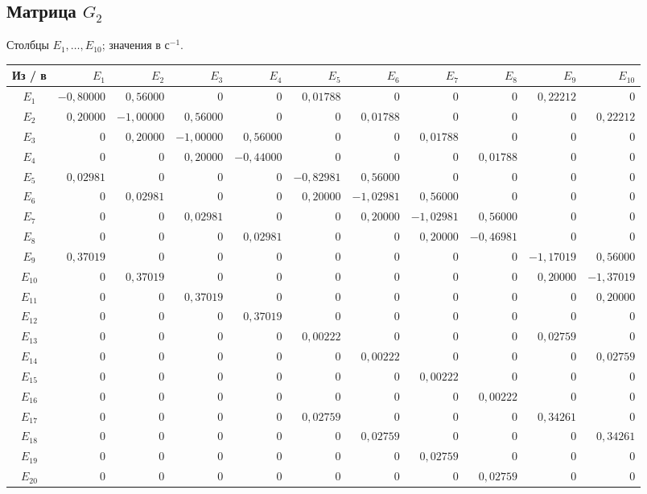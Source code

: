 \documentclass[12pt,a4paper]{article}
\begin{document}
\subsection{Матрица $G_2$}
\noindent Столбцы $E_{1},\ldots,E_{10}$; значения в $\text{с}^{-1}$.
\begin{center}\scriptsize\setlength{\tabcolsep}{2.6pt}\renewcommand{\arraystretch}{1.18}
\begin{tabular}{|c|r|r|r|r|r|r|r|r|r|r|}\hline
Из / в&$E_{1}$&$E_{2}$&$E_{3}$&$E_{4}$&$E_{5}$&$E_{6}$&$E_{7}$&$E_{8}$&$E_{9}$&$E_{10}$\\\hline
$E_{1}$&$-0{,}80000$&$0{,}56000$&$0$&$0$&$0{,}01788$&$0$&$0$&$0$&$0{,}22212$&$0$\\\hline
$E_{2}$&$0{,}20000$&$-1{,}00000$&$0{,}56000$&$0$&$0$&$0{,}01788$&$0$&$0$&$0$&$0{,}22212$\\\hline
$E_{3}$&$0$&$0{,}20000$&$-1{,}00000$&$0{,}56000$&$0$&$0$&$0{,}01788$&$0$&$0$&$0$\\\hline
$E_{4}$&$0$&$0$&$0{,}20000$&$-0{,}44000$&$0$&$0$&$0$&$0{,}01788$&$0$&$0$\\\hline
$E_{5}$&$0{,}02981$&$0$&$0$&$0$&$-0{,}82981$&$0{,}56000$&$0$&$0$&$0$&$0$\\\hline
$E_{6}$&$0$&$0{,}02981$&$0$&$0$&$0{,}20000$&$-1{,}02981$&$0{,}56000$&$0$&$0$&$0$\\\hline
$E_{7}$&$0$&$0$&$0{,}02981$&$0$&$0$&$0{,}20000$&$-1{,}02981$&$0{,}56000$&$0$&$0$\\\hline
$E_{8}$&$0$&$0$&$0$&$0{,}02981$&$0$&$0$&$0{,}20000$&$-0{,}46981$&$0$&$0$\\\hline
$E_{9}$&$0{,}37019$&$0$&$0$&$0$&$0$&$0$&$0$&$0$&$-1{,}17019$&$0{,}56000$\\\hline
$E_{10}$&$0$&$0{,}37019$&$0$&$0$&$0$&$0$&$0$&$0$&$0{,}20000$&$-1{,}37019$\\\hline
$E_{11}$&$0$&$0$&$0{,}37019$&$0$&$0$&$0$&$0$&$0$&$0$&$0{,}20000$\\\hline
$E_{12}$&$0$&$0$&$0$&$0{,}37019$&$0$&$0$&$0$&$0$&$0$&$0$\\\hline
$E_{13}$&$0$&$0$&$0$&$0$&$0{,}00222$&$0$&$0$&$0$&$0{,}02759$&$0$\\\hline
$E_{14}$&$0$&$0$&$0$&$0$&$0$&$0{,}00222$&$0$&$0$&$0$&$0{,}02759$\\\hline
$E_{15}$&$0$&$0$&$0$&$0$&$0$&$0$&$0{,}00222$&$0$&$0$&$0$\\\hline
$E_{16}$&$0$&$0$&$0$&$0$&$0$&$0$&$0$&$0{,}00222$&$0$&$0$\\\hline
$E_{17}$&$0$&$0$&$0$&$0$&$0{,}02759$&$0$&$0$&$0$&$0{,}34261$&$0$\\\hline
$E_{18}$&$0$&$0$&$0$&$0$&$0$&$0{,}02759$&$0$&$0$&$0$&$0{,}34261$\\\hline
$E_{19}$&$0$&$0$&$0$&$0$&$0$&$0$&$0{,}02759$&$0$&$0$&$0$\\\hline
$E_{20}$&$0$&$0$&$0$&$0$&$0$&$0$&$0$&$0{,}02759$&$0$&$0$\\\hline
\end{tabular}\end{center}
\end{document}
